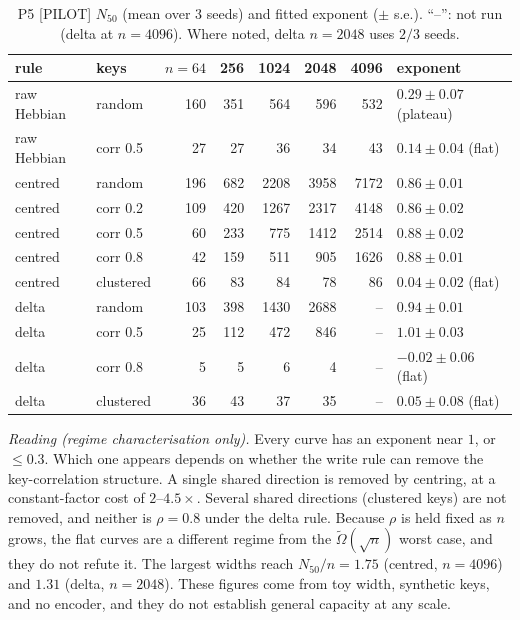 \documentclass[10pt]{article}
\theoremstyle{remark}
\begin{document}
\begin{table}[h]
\centering\small
\caption{P5 [PILOT] $N_{50}$ (mean over 3 seeds) and fitted exponent ($\pm$ s.e.). ``--'': not run (delta at $n=4096$). Where noted, delta $n{=}2048$ uses $2/3$ seeds.}
\label{tab:p5}
\begin{tabular}{@{}llrrrrrl@{}}
\toprule
rule & keys & $n{=}64$ & 256 & 1024 & 2048 & 4096 & exponent \\
\midrule
raw Hebbian & random & 160 & 351 & 564 & 596 & 532 & $0.29\pm0.07$ (plateau) \\
raw Hebbian & corr 0.5 & 27 & 27 & 36 & 34 & 43 & $0.14\pm0.04$ (flat) \\
centred & random & 196 & 682 & 2208 & 3958 & 7172 & $\mathbf{0.86\pm0.01}$ \\
centred & corr 0.2 & 109 & 420 & 1267 & 2317 & 4148 & $0.86\pm0.02$ \\
centred & corr 0.5 & 60 & 233 & 775 & 1412 & 2514 & $0.88\pm0.02$ \\
centred & corr 0.8 & 42 & 159 & 511 & 905 & 1626 & $0.88\pm0.01$ \\
centred & clustered & 66 & 83 & 84 & 78 & 86 & $0.04\pm0.02$ (flat) \\
delta & random & 103 & 398 & 1430 & 2688 & -- & $\mathbf{0.94\pm0.01}$ \\
delta & corr 0.5 & 25 & 112 & 472 & 846 & -- & $1.01\pm0.03$ \\
delta & corr 0.8 & 5 & 5 & 6 & 4 & -- & $-0.02\pm0.06$ (flat) \\
delta & clustered & 36 & 43 & 37 & 35 & -- & $0.05\pm0.08$ (flat) \\
\bottomrule
\end{tabular}
\end{table}
\emph{Reading (regime characterisation only).} Every curve has an exponent near $1$, or $\le 0.3$. Which one appears
depends on whether the write rule can remove the key-correlation structure. A single shared direction is removed
by centring, at a constant-factor cost of $2$--$4.5\times$. Several shared directions (clustered keys) are not
removed, and neither is $\rho=0.8$ under the delta rule. Because $\rho$ is held fixed as $n$ grows, the flat curves
are a different regime from the $\tilde\Omega(\sqrt n)$ worst case, and they do not refute it. The largest widths
reach $N_{50}/n=1.75$ (centred, $n=4096$) and $1.31$ (delta, $n=2048$). These figures come from toy width, synthetic
keys, and no encoder, and they do not establish general capacity at any scale.
\end{document}
